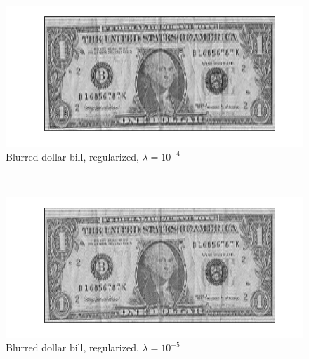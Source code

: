 \documentclass[12pt]{article}
\begin{document}
\begin{flushleft}
\begin{figure}[H]
	\centering
	\captionsetup{justification=centering}
	\includegraphics[scale=0.55]{images/lambda00001.png}
	\caption{Blurred dollar bill, regularized, $\lambda = 10^{-4}$}
	\label{lambda4}
\end{figure}
\ \\

\begin{figure}[H]
	\centering
	\captionsetup{justification=centering}
	\includegraphics[scale=0.55]{images/lambda000001.png}
	\caption{Blurred dollar bill, regularized, $\lambda = 10^{-5}$}
	\label{lambda5}
\end{figure}
\ \\


\end{flushleft}
\end{document}
